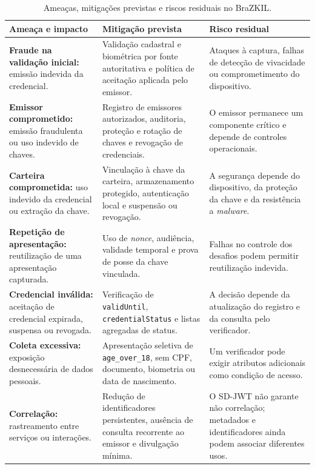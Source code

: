 \documentclass[12pt]{article}
\begin{document}
\begin{table}[t]
\centering
\caption{Ameaças, mitigações previstas e riscos residuais no BraZKIL.}
\label{tab:ameacas-brazkil}
\footnotesize
\renewcommand{\arraystretch}{1.08}
\setlength{\tabcolsep}{3pt}

\begin{tabularx}{\columnwidth}{@{}
>{\raggedright\arraybackslash}p{}
>{\raggedright\arraybackslash}X
>{\raggedright\arraybackslash}p{}
@{}}

\toprule
\textbf{Ameaça e impacto} &
\textbf{Mitigação prevista} &
\textbf{Risco residual} \\
\midrule

\textbf{Fraude na validação inicial:}
emissão indevida da credencial.
&
Validação cadastral e biométrica por fonte autoritativa e política de aceitação aplicada pelo emissor.
&
Ataques à captura, falhas de detecção de vivacidade ou comprometimento do dispositivo.
\\

\textbf{Emissor comprometido:}
emissão fraudulenta ou uso indevido de chaves.
&
Registro de emissores autorizados, auditoria, proteção e rotação de chaves e revogação de credenciais.
&
O emissor permanece um componente crítico e depende de controles operacionais.
\\

\textbf{Carteira comprometida:}
uso indevido da credencial ou extração da chave.
&
Vinculação à chave da carteira, armazenamento protegido, autenticação local e suspensão ou revogação.
&
A segurança depende do dispositivo, da proteção da chave e da resistência a \textit{malware}.
\\

\textbf{Repetição de apresentação:}
reutilização de uma apresentação capturada.
&
Uso de \textit{nonce}, audiência, validade temporal e prova de posse da chave vinculada.
&
Falhas no controle dos desafios podem permitir reutilização indevida.
\\

\textbf{Credencial inválida:}
aceitação de credencial expirada, suspensa ou revogada.
&
Verificação de \texttt{validUntil}, \texttt{credentialStatus} e listas agregadas de status.
&
A decisão depende da atualização do registro e da consulta pelo verificador.
\\

\textbf{Coleta excessiva:}
exposição desnecessária de dados pessoais.
&
Apresentação seletiva de \texttt{age\_over\_18}, sem CPF, documento, biometria ou data de nascimento.
&
Um verificador pode exigir atributos adicionais como condição de acesso.
\\

\textbf{Correlação:}
rastreamento entre serviços ou interações.
&
Redução de identificadores persistentes, ausência de consulta recorrente ao emissor e divulgação mínima.
&
O SD-JWT não garante não correlação; metadados e identificadores ainda podem associar diferentes usos.
\\

\bottomrule
\end{tabularx}
\end{table}
\end{document}
